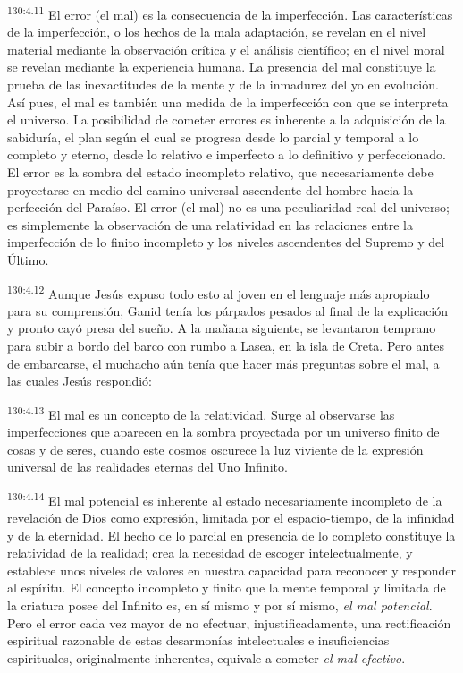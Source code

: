 \par
\textsuperscript{130:4.11} El error (el mal) es la consecuencia de la imperfección. Las características de la imperfección, o los hechos de la mala adaptación, se revelan en el nivel material mediante la observación crítica y el análisis científico; en el nivel moral se revelan mediante la experiencia humana. La presencia del mal constituye la prueba de las inexactitudes de la mente y de la inmadurez del yo en evolución. Así pues, el mal es también una medida de la imperfección con que se interpreta el universo. La posibilidad de cometer errores es inherente a la adquisición de la sabiduría, el plan según el cual se progresa desde lo parcial y temporal a lo completo y eterno, desde lo relativo e imperfecto a lo definitivo y perfeccionado. El error es la sombra del estado incompleto relativo, que necesariamente debe proyectarse en medio del camino universal ascendente del hombre hacia la perfección del Paraíso. El error (el mal) no es una peculiaridad real del universo; es simplemente la observación de una relatividad en las relaciones entre la imperfección de lo finito incompleto y los niveles ascendentes del Supremo y del Último.

\par
\textsuperscript{130:4.12} Aunque Jesús expuso todo esto al joven en el lenguaje más apropiado para su comprensión, Ganid tenía los párpados pesados al final de la explicación y pronto cayó presa del sueño. A la mañana siguiente, se levantaron temprano para subir a bordo del barco con rumbo a Lasea, en la isla de Creta. Pero antes de embarcarse, el muchacho aún tenía que hacer más preguntas sobre el mal, a las cuales Jesús respondió:

\par
\textsuperscript{130:4.13} El mal es un concepto de la relatividad. Surge al observarse las imperfecciones que aparecen en la sombra proyectada por un universo finito de cosas y de seres, cuando este cosmos oscurece la luz viviente de la expresión universal de las realidades eternas del Uno Infinito.

\par
\textsuperscript{130:4.14} El mal potencial es inherente al estado necesariamente incompleto de la revelación de Dios como expresión, limitada por el espacio-tiempo, de la infinidad y de la eternidad. El hecho de lo parcial en presencia de lo completo constituye la relatividad de la realidad; crea la necesidad de escoger intelectualmente, y establece unos niveles de valores en nuestra capacidad para reconocer y responder al espíritu. El concepto incompleto y finito que la mente temporal y limitada de la criatura posee del Infinito es, en sí mismo y por sí mismo, \textit{el mal potencial}. Pero el error cada vez mayor de no efectuar, injustificadamente, una rectificación espiritual razonable de estas desarmonías intelectuales e insuficiencias espirituales, originalmente inherentes, equivale a cometer \textit{el mal efectivo}.

